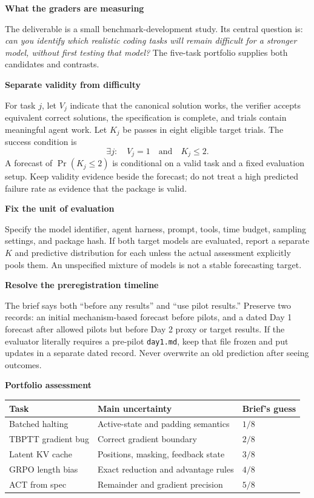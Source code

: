 \documentclass[11pt,a4paper]{article}
\newcommand{\sect}[2]{\vspace{3pt}{\small\color{accent}\textbf{#1}}\par{\LARGE\bfseries #2}\par\vspace{6pt}}
\newcommand{\sub}[1]{\vspace{4pt}\textbf{#1}\par}
\newcommand{\code}[1]{\texttt{#1}}
\begin{document}
\newpage
\sect{01 / OBJECTIVE}{What the graders are measuring}

The deliverable is a small benchmark-development study. Its central question is: \emph{can you identify which realistic coding tasks will remain difficult for a stronger model, without first testing that model?} The five-task portfolio supplies both candidates and contrasts.

\sub{Separate validity from difficulty}
For task $j$, let $V_j$ indicate that the canonical solution works, the verifier accepts equivalent correct solutions, the specification is complete, and trials contain meaningful agent work. Let $K_j$ be passes in eight eligible target trials. The success condition is
\[
  \exists j:\quad V_j=1\quad\text{and}\quad K_j\leq 2.
\]
A forecast of $\Pr(K_j\leq2)$ is conditional on a valid task and a fixed evaluation setup. Keep validity evidence beside the forecast; do not treat a high predicted failure rate as evidence that the package is valid.

\sub{Fix the unit of evaluation}
Specify the model identifier, agent harness, prompt, tools, time budget, sampling settings, and package hash. If both target models are evaluated, report a separate $K$ and predictive distribution for each unless the actual assessment explicitly pools them. An unspecified mixture of models is not a stable forecasting target.

\sub{Resolve the preregistration timeline}
The brief says both ``before any results'' and ``use pilot results.'' Preserve two records: an initial mechanism-based forecast before pilots, and a dated Day 1 forecast after allowed pilots but before Day 2 proxy or target results. If the evaluator literally requires a pre-pilot \code{day1.md}, keep that file frozen and put updates in a separate dated record. Never overwrite an old prediction after seeing outcomes.

\sub{Portfolio assessment}
\begin{tabularx}{\linewidth}{@{}lXl@{}}
\toprule
Task & Main uncertainty & Brief's guess\\
\midrule
Batched halting & Active-state and padding semantics & $1/8$\\
TBPTT gradient bug & Correct gradient boundary & $2/8$\\
Latent KV cache & Positions, masking, feedback state & $3/8$\\
GRPO length bias & Exact reduction and advantage rules & $4/8$\\
ACT from spec & Remainder and gradient precision & $5/8$\\
\bottomrule
\end{tabularx}
\end{document}
